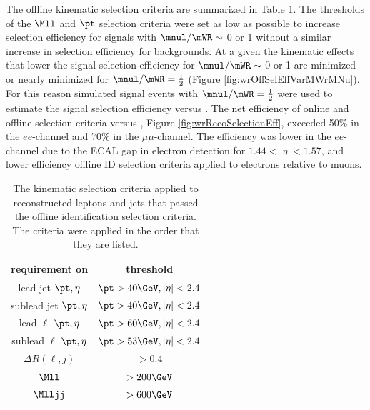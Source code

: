 The offline kinematic selection criteria are summarized in Table \ref{tab:offlineKinemSel}.  The thresholds 
of the $\Mll$ and $\pt$ selection criteria were set as low as possible to increase selection efficiency for signals with $\mnul/\mWR \sim$ 0 or 1 
without a similar increase in selection efficiency for backgrounds.  At a given \mWR the kinematic effects that lower the signal selection 
efficiency for $\mnul/\mWR \sim$ 0 or 1 are minimized or nearly minimized for $\mnul/\mWR = \frac{1}{2}$ (Figure \ref{fig:wrOffSelEffVarMWrMNu}).  
For this reason simulated signal events with $\mnul/\mWR = \frac{1}{2}$ were used to estimate the signal selection efficiency versus \mWR.  The 
net efficiency of online and offline selection criteria versus \mWR, Figure \ref{fig:wrRecoSelectionEff}, exceeded 50\% in the $ee$-channel and 
70\% in the $\mu\mu$-channel.  The efficiency was lower in the $ee$-channel due to the ECAL gap in electron detection for $1.44 < |\eta| < 1.57$, 
and lower efficiency offline ID selection criteria applied to electrons relative to muons.

\begin{table}[h]
	\caption{The kinematic selection criteria applied to reconstructed leptons and jets that passed the offline identification 
	selection criteria.  The criteria were applied in the order that they are listed.}
	\label{tab:offlineKinemSel}
	\centering
	\begin{tabular}{c|c}
		requirement on & threshold  \\  \hline
		lead jet $\pt,\eta$ & $\pt>40\GeV,|\eta|<2.4$ \\
		sublead jet $\pt,\eta$ & $\pt>40\GeV,|\eta|<2.4$ \\
		lead $\ell$ $\pt,\eta$ & $\pt>60\GeV,|\eta|<2.4$ \\
		sublead $\ell$ $\pt,\eta$ & $\pt>53\GeV,|\eta|<2.4$ \\
		$\Delta R(\ell,j)$ & $>0.4$ \\
		$\Mll$ & $>200\GeV$ \\
		$\Mlljj$ & $>600\GeV$ \\ \hline
	\end{tabular}
\end{table}

